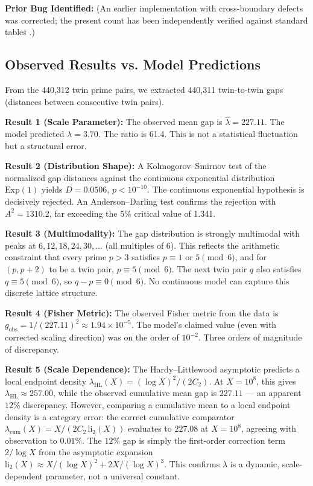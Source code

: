 \documentclass[11pt]{article}
\begin{document}
\noindent \textbf{Prior Bug Identified:} (An earlier implementation with cross-boundary defects was corrected; the present count has been independently verified against standard tables \cite{Nic12}.)

\subsection{Observed Results vs. Model Predictions}
From the 440,312 twin prime pairs, we extracted 440,311 twin-to-twin gaps (distances between consecutive twin pairs).

\noindent \textbf{Result 1 (Scale Parameter):} The observed mean gap is $\hat{\lambda} = 227.11$. The model predicted $\lambda = 3.70$. The ratio is 61.4. This is not a statistical fluctuation but a structural error.

\noindent \textbf{Result 2 (Distribution Shape):} A Kolmogorov--Smirnov test of the normalized gap distances against the continuous exponential distribution $\text{Exp}(1)$ yields $D = 0.0506$, $p < 10^{-10}$. The continuous exponential hypothesis is decisively rejected. An Anderson--Darling test confirms the rejection with $A^2 = 1310.2$, far exceeding the 5\% critical value of 1.341.

\noindent \textbf{Result 3 (Multimodality):} The gap distribution is strongly multimodal with peaks at $6, 12, 18, 24, 30, \ldots$ (all multiples of 6). This reflects the arithmetic constraint that every prime $p > 3$ satisfies $p \equiv 1$ or $5 \pmod{6}$, and for $(p, p+2)$ to be a twin pair, $p \equiv 5 \pmod{6}$. The next twin pair $q$ also satisfies $q \equiv 5 \pmod{6}$, so $q - p \equiv 0 \pmod{6}$. No continuous model can capture this discrete lattice structure.

\noindent \textbf{Result 4 (Fisher Metric):} The observed Fisher metric from the data is $g_{\text{obs}} = 1/(227.11)^2 \approx 1.94 \times 10^{-5}$. The model's claimed value (even with corrected scaling direction) was on the order of $10^{-2}$. Three orders of magnitude of discrepancy.

\noindent \textbf{Result 5 (Scale Dependence):} The Hardy--Littlewood asymptotic predicts a local endpoint density $\lambda_{\mathrm{HL}}(X) = (\log X)^2/(2C_2)$. At $X = 10^8$, this gives $\lambda_{\mathrm{HL}} \approx 257.00$, while the observed cumulative mean gap is $227.11$ — an apparent $12\%$ discrepancy. However, comparing a cumulative mean to a local endpoint density is a category error: the correct cumulative comparator $\lambda_{\mathrm{cum}}(X) = X/(2C_2\,\mathrm{li}_2(X))$ evaluates to $227.08$ at $X = 10^8$, agreeing with observation to $0.01\%$. The $12\%$ gap is simply the first-order correction term $2/\log X$ from the asymptotic expansion $\mathrm{li}_2(X) \approx X/(\log X)^2 + 2X/(\log X)^3$. This confirms $\lambda$ is a dynamic, scale-dependent parameter, not a universal constant.
\end{document}
